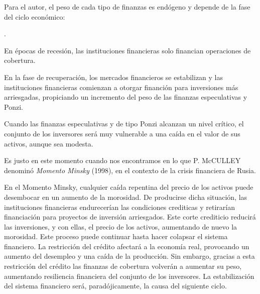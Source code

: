 \documentclass[10pt,a4paper]{article}
\newcounter{numitem}
\newenvironment{lnum}
      {\begin{list}{\arabic{numitem}.}{%
          \usecounter{numitem}%
          \setlength{\leftmargin}{1cm}%
          \setlength{\parskip}{3pt}%
          \setlength{\itemsep}{0pt}%
          \setlength{\parsep}{0pt}%
      }}
      {\end{list}}
\begin{document}
Para el autor, el peso de cada tipo de finanzas es endógeno y depende de la fase del ciclo económico:
\begin{lnum}
    \item En épocas de recesión, las instituciones financieras solo financian operaciones de cobertura. 
    \item En la fase de recuperación, los mercados financieros se estabilizan y las instituciones financieras comienzan a otorgar financión para inversiones más arriesgadas, propiciando un incremento del peso de las finanzas especulativas y Ponzi. 
    \item Cuando las finanzas especulativas y de tipo Ponzi alcanzan un nivel crítico, el conjunto de los inversores será muy vulnerable a una caída en el valor de sus activos, aunque sea modesta.
\end{lnum} 

Es justo en este momento cuando nos encontramos en lo que P. McCULLEY denominó \textit{Momento Minsky} (1998), en el contexto de la crisis financiera de Rusia. 

En el Momento Minsky, cualquier caída repentina del precio de los activos puede desembocar en un aumento de la morosidad. De producirse dicha situación, las instituciones financieras endurecerían las condiciones crediticas y retirarían financiación para proyectos de inversión arriesgados. Este corte crediticio reducirá las inversiones, y con ellas, el precio de los activos, aumentando de nuevo la morosidad. Este proceso puede continuar hasta hacer colapsar el sistema financiero. La restricción del crédito afectará a la economía real, provocando un aumento del desempleo y una caída de la producción. Sin embargo, gracias a esta restricción del crédito las finanzas de cobertura volverán a aumentar su peso, aumentando resiliencia financiera del conjunto de los inversores. La estabilización del sistema financiero será, paradójicamente, la causa del siguiente ciclo.
\end{document}
